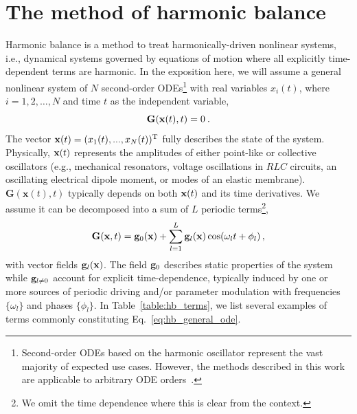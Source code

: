 \section{The method of harmonic balance} \label{sec:hb}
Harmonic balance is a method to treat harmonically-driven nonlinear systems, i.e., dynamical systems governed by equations of motion where all explicitly time-dependent terms are harmonic. In the exposition here, we will assume a general nonlinear system of $N$ second-order ODEs\footnote{Second-order ODEs based on the harmonic oscillator represent the vast majority of expected use cases. However, the methods described in this work are applicable to arbitrary ODE orders~\cite{Richards}.} with real variables $x_i(t)$, where $i = 1,2,\ldots,N$ and time $t$ as the independent variable,
\begin{equation} \label{eq:hb_general_ode}
\vb{G}(\vb{x}(t), t)=0\:.
\end{equation}
The vector $\vb{x}(t) = (x_1(t), ..., x_N(t))^{\text T}$ fully describes the state of the system.  Physically, $\vb{x}(t)$ represents the amplitudes of either point-like or collective oscillators (e.g., mechanical resonators, voltage oscillations in $RLC$ circuits, an oscillating electrical dipole moment, or modes of an elastic membrane). $\textbf{G}(\textbf{x}(t),t)$ typically depends on both $\vb{x}(t)$ and its time derivatives. We assume it can be decomposed into a sum of $L$ periodic terms\footnote{We omit the time dependence where this is clear from the context.},
\begin{equation} \label{eq:hb_G}
\vb{G}(\vb{x}, t) = \vb{g}_0(\vb{x}) + \sum_{l=1}^L \vb{g}_{l}(\vb{x}) \cos(\omega_l t + \phi_l)\,,
\end{equation}
with vector fields $\vb{g}_l(\vb{x})$.  The field $\vb{g}_0$ describes static properties of the system while $\vb{g}_{l\neq0}$ account for explicit time-dependence, typically induced by one or more sources of periodic driving and/or parameter modulation with frequencies $\{\omega_l\}$ and phases $\{\phi_l\}$. In Table~\ref{table:hb_terms}, we list several examples of terms commonly constituting Eq.~\eqref{eq:hb_general_ode}. 

